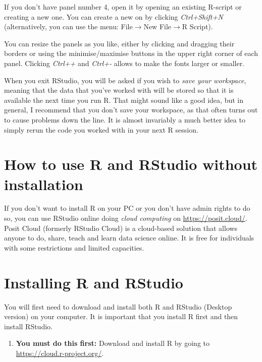 \documentclass[
  12pt,
  oneside]{book}
\providecommand{\tightlist}{%
  \setlength{\itemsep}{0pt}\setlength{\parskip}{0pt}}
\begin{document}
If you don't have panel number 4, open it by opening an existing R-script or creating a new one. You can create a new on by clicking \emph{Ctrl+Shift+N} (alternatively, you can use the menu: File\(\rightarrow\)New File\(\rightarrow\)R Script).

You can resize the panels as you like, either by clicking and dragging their borders or using the minimise/maximise buttons in the upper right corner of each panel. Clicking \emph{Ctrl++} and \emph{Ctrl+-} allows to make the fonts larger or smaller.

When you exit RStudio, you will be asked if you wish to \emph{save your workspace}, meaning that the data that you've worked with will be stored so that it is available the next time you run R. That might sound like a good idea, but in general, I recommend that you don't save your workspace, as that often turns out to cause problems down the line. It is almost invariably a much better idea to simply rerun the code you worked with in your next R session.

\hypertarget{how-to-use-r-and-rstudio-without-installation}{%
\section{How to use R and RStudio without installation}\label{how-to-use-r-and-rstudio-without-installation}}

If you don't want to install R on your PC or you don't have admin rights to do so, you can use RStudio online doing \emph{cloud computing} on \url{https://posit.cloud/}.
Posit Cloud (formerly RStudio Cloud) is a cloud-based solution that allows anyone to do, share, teach and learn data science online. It is free for individuals with some restrictions and limited capacities.

\hypertarget{installing}{%
\section{Installing R and RStudio}\label{installing}}

You will first need to download and install both R and RStudio (Desktop version) on your computer. It is important that you install R first and then install RStudio.

\begin{enumerate}
\def\labelenumi{\arabic{enumi}.}
\tightlist
\item
  \textbf{You must do this first:} Download and install R by going to \url{https://cloud.r-project.org/}. 
\end{enumerate}
\end{document}
